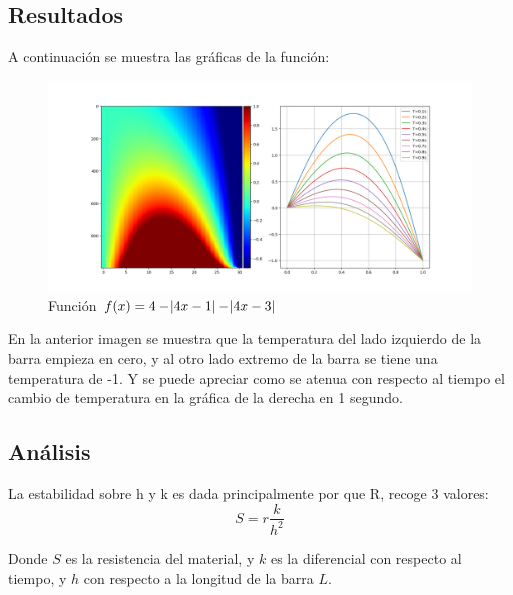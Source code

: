 \documentclass[a4paper,12pt]{article}
\newcommand{\eq}[1]{$#1$}
\begin{document}
    \subsection{Resultados}
    A continuación se muestra las gráficas de la función:
    \begin{figure}[h]
        \centering
        \includegraphics[width=\textwidth]{ejer4_graph.png}
        \caption{Función \eq{f(x) = 4 - \abs{4x-1} - \abs{4x-3}}}
    \end{figure}        

    En la anterior imagen se muestra que la temperatura del 
    lado izquierdo de la barra empieza en cero, y al otro lado extremo de la barra 
    se tiene una temperatura de -1. Y se puede apreciar como se atenua con respecto
    al tiempo el cambio de temperatura en la gráfica de la derecha en 1 segundo.

    \subsection{Análisis}
    La estabilidad sobre h y k es dada principalmente por que R, recoge 3 valores:
    \begin{equation}
        S = r\frac{k}{h^2}
    \end{equation}
    
    Donde \eq{S} es la resistencia del material, y \eq{k} es la diferencial con 
    respecto al tiempo, y \eq{h} con respecto a la longitud de la barra \eq{L}.
\end{document}
